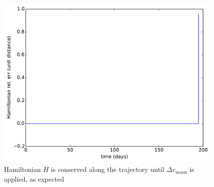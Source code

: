 \begin{figure}[ht!]
\centering
\includegraphics[scale=0.35]{fig/low-energy-long/H_low_energy_long.pdf}
\caption{Hamiltonian $H$ is conserved along the trajectory until $\Delta v_{\text{moon}}$ is applied, as expected}
\label{fig:low_energy_long-H}
\end{figure}


